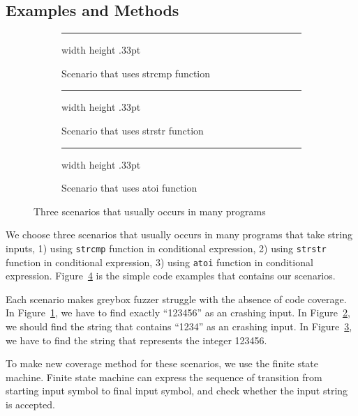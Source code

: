 \documentclass[12pt]{sigplanconf}
\begin{document}
\subsection{Examples and Methods}

\begin{figure}[h]
    \begin{subfigure}[t]{0.45\textwidth}
        \cFormat
        
        \hrule width \hsize height .33pt
        \caption{Scenario that uses strcmp function}
        \label{fig:strcmp}
    \end{subfigure}
    \begin{subfigure}[t]{0.45\textwidth}
        \cFormat
        
        \hrule width \hsize height .33pt
        \caption{Scenario that uses strstr function}
        \label{fig:strstr}
    \end{subfigure}
    \begin{subfigure}[t]{0.45\textwidth}
        \cFormat
        
        \hrule width \hsize height .33pt
        \caption{Scenario that uses atoi function}
        \label{fig:atoi}
    \end{subfigure}
    \caption{Three scenarios that usually occurs in many programs}
    \label{fig:scenarios}
\end{figure}

We choose three scenarios that usually occurs in many programs that take string inputs, 1) using \verb|strcmp| function
in conditional expression, 2) using \verb|strstr| function in conditional expression, 3) using \verb|atoi| function in
conditional expression. Figure~\ref{fig:scenarios} is the simple code examples that contains our scenarios.

Each scenario makes greybox fuzzer struggle with the absence of code coverage. In Figure~\ref{fig:strcmp}, we have to find
exactly ``123456'' as an crashing input. In Figure~\ref{fig:strstr}, we should find the string that contains ``1234'' as
an crashing input. In Figure~\ref{fig:atoi}, we have to find the string that represents the integer 123456.

To make new coverage method for these scenarios, we use the finite state machine. Finite state machine can express the
sequence of transition from starting input symbol to final input symbol, and check whether the input string is accepted.
\end{document}
